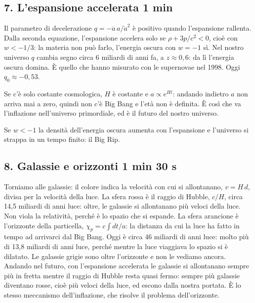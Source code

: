 \subsection*{7. L'espansione accelerata \hfill\normalfont\small 1 min}
Il parametro di decelerazione $q = -\ddot a\, a/\dot a^2$ è positivo quando l'espansione rallenta. Dalla seconda equazione, l'espansione accelera solo se $\rho + 3p/c^2 < 0$, cioè con $w < -1/3$: la materia non può farlo, l'energia oscura con $w = -1$ sì.
Nel nostro universo $q$ cambia segno circa 6 miliardi di anni fa, a $z \approx 0{,}6$: da lì l'energia oscura domina. È quello che hanno misurato con le supernovae nel 1998. Oggi $q_0 \approx -0{,}53$.

Se c'è solo costante cosmologica, $H$ è costante e $a \propto e^{Ht}$: andando indietro $a$ non arriva mai a zero, quindi non c'è Big Bang e l'età non è definita. È così che va l'inflazione nell'universo primordiale, ed è il futuro del nostro universo.

Se $w < -1$ la densità dell'energia oscura aumenta con l'espansione e l'universo si strappa in un tempo finito: il Big Rip.

\subsection*{8. Galassie e orizzonti \hfill\normalfont\small 1 min 30 s}
Torniamo alle galassie: il colore indica la velocità con cui si allontanano, $v = H\, d$, divisa per la velocità della luce.
La sfera rossa è il raggio di Hubble, $c/H$, circa 14,5 miliardi di anni luce: oltre, le galassie si allontanano più veloci della luce. Non viola la relatività, perché è lo spazio che si espande.
La sfera arancione è l'orizzonte della particella, $\chi_p = c\int dt/a$: la distanza da cui la luce ha fatto in tempo ad arrivarci dal Big Bang. Oggi è circa 46 miliardi di anni luce: molto più di 13,8 miliardi di anni luce, perché mentre la luce viaggiava lo spazio si è dilatato. Le galassie grigie sono oltre l'orizzonte e non le vediamo ancora.
Andando nel futuro, con l'espansione accelerata le galassie si allontanano sempre più in fretta mentre il raggio di Hubble resta quasi fermo: sempre più galassie diventano rosse, cioè più veloci della luce, ed escono dalla nostra portata. È lo stesso meccanismo dell'inflazione, che risolve il problema dell'orizzonte.

